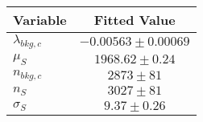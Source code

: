 \begin{tabular}[t]{lc}
\hline
Variable &Fitted Value\\
\hline\hline
$\lambda_{bkg,c}$&$-0.00563\pm0.00069$\\
\hline
$\mu_{S}$&$1968.62\pm0.24$\\
\hline
$n_{bkg,c}$&$2873\pm81$\\
\hline
$n_{S}$&$3027\pm81$\\
\hline
$\sigma_{S}$&$9.37\pm0.26$\\
\hline
\end{tabular}